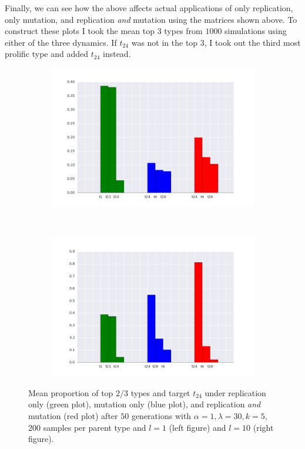 \documentclass[a4paper]{article}
\begin{document}
\newpage

Finally, we can see how the above affects actual applications of only replication, only mutation, and replication \emph{and} mutation using the matrices shown above. To construct these plots I took the mean top $3$ types from $1000$ simulations using either of the three dynamics. If $t_{24}$ was not in the top $3$, I took out the third most prolific type and added $t_{24}$ instead. 

\begin{figure}[h!]
  \centering
  \begin{subfigure}[b]{0.45\textwidth}
    \includegraphics[scale=0.4]{../code-LOT-extension/rmd-lam30-a1-k5-s200-l1.png}
  \end{subfigure}
  ~
   \begin{subfigure}[b]{0.45\textwidth}
    \includegraphics[scale=0.4]{../code-LOT-extension/rmd-lam30-a1-k5-s200-l10.png}
  \end{subfigure}
  \caption{Mean proportion of top $2/3$ types and target $t_{24}$ under replication only (green plot), mutation only (blue plot), and replication {\em and} mutation (red plot) after $50$ generations with $\alpha = 1, \lambda = 30, k = 5$, $200$ samples per parent type and $l = 1$ (left figure) and $l = 10$ (right figure).}
  \label{fig:outcomes}
\end{figure}






\end{document}
